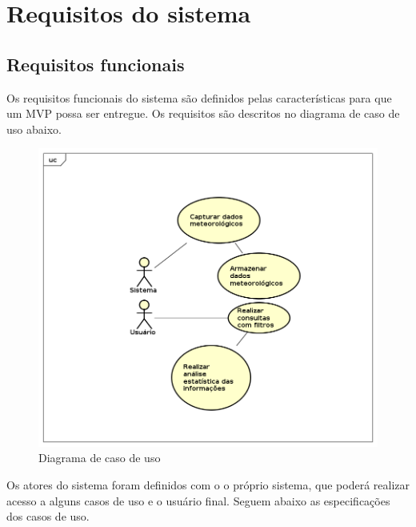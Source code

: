 \chapter{Requisitos do sistema}

\section{Requisitos funcionais}

Os requisitos funcionais do sistema são definidos pelas características para que um MVP possa ser entregue.
Os requisitos são descritos no diagrama de caso de uso abaixo.

\begin{figure}[H]
    \label{figure_diagrama_caso_uso}
    \centering
    \caption{Diagrama de caso de uso} \label{includegraphics_diagrama_caso_uso}
    \includegraphics[scale=0.6]{diagrams/caso_de_uso.png}
    \hfill
\end{figure}

Os atores do sistema foram definidos com o o próprio sistema, que poderá realizar acesso a alguns casos de uso e o usuário final.
Seguem abaixo as especificações dos casos de uso.

